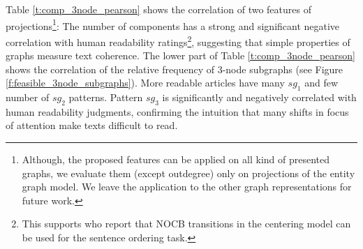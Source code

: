 Table \ref{t:comp_3node_pearson} shows the correlation of two features of projections\footnote{Although, the proposed features can be applied on all kind of presented graphs, we evaluate them (except outdegree) only on projections of the entity graph model. 
We leave the application to the other graph representations for future work.}:
The number of components has a strong and significant negative correlation with human readability ratings\footnote{This supports
   who report that NOCB transitions in the centering model can be used for the sentence ordering task.},
suggesting that simple properties of graphs measure text
coherence. 
The lower part of Table \ref{t:comp_3node_pearson} shows the correlation of the relative frequency of 3-node subgraphs (see Figure \ref{f:feasible_3node_subgraphs}).  
More readable articles have many $sg_1$ and few number of $sg_2$ patterns. 
Pattern $sg_3$ is significantly and negatively correlated with human readability judgments, confirming the intuition that many shifts in focus
of attention make texts difficult to read. 



